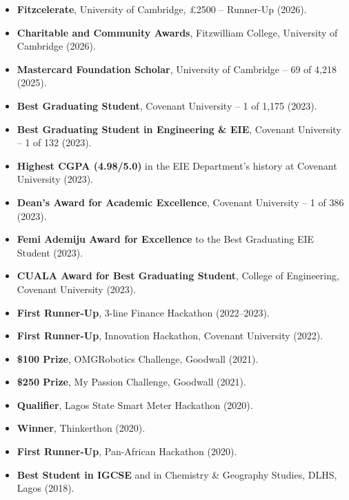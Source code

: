 \begin{itemize}
    \item \textbf{Fitzcelerate}, University of Cambridge, £2500 -- Runner-Up (2026).
    \item \textbf{Charitable and Community Awards}, Fitzwilliam College, University of Cambridge (2026).
    \item \textbf{Mastercard Foundation Scholar}, University of Cambridge -- 69 of 4{,}218 (2025).
    \item \textbf{Best Graduating Student}, Covenant University -- 1 of 1{,}175 (2023).
    \item \textbf{Best Graduating Student in Engineering \& EIE}, Covenant University -- 1 of 132 (2023).
    \item \textbf{Highest CGPA (4.98/5.0)} in the EIE Department's history at Covenant University (2023).
    \item \textbf{Dean's Award for Academic Excellence}, Covenant University -- 1 of 386 (2023).
    \item \textbf{Femi Ademiju Award for Excellence} to the Best Graduating EIE Student (2023).
    \item \textbf{CUALA Award for Best Graduating Student}, College of Engineering, Covenant University (2023).
    \item \textbf{First Runner-Up}, 3-line Finance Hackathon (2022--2023).
    \item \textbf{First Runner-Up}, Innovation Hackathon, Covenant University (2022).
    \item \textbf{\$100 Prize}, OMGRobotics Challenge, Goodwall (2021).
    \item \textbf{\$250 Prize}, My Passion Challenge, Goodwall (2021).
    \item \textbf{Qualifier}, Lagos State Smart Meter Hackathon (2020).
    \item \textbf{Winner}, Thinkerthon (2020).
    \item \textbf{First Runner-Up}, Pan-African Hackathon (2020).
    \item \textbf{Best Student in IGCSE} and in Chemistry \& Geography Studies, DLHS, Lagos (2018).
\end{itemize}
